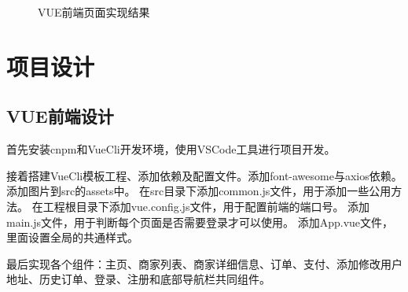 \begin{figure}[H]
{\begin{minipage}[t]{0.22\linewidth}
        \end{minipage}
    }
    \centering
    \caption{VUE前端页面实现结果}
\end{figure}

\section{项目设计}

\subsection{VUE前端设计}
首先安装cnpm和VueCli开发环境，使用VSCode工具进行项目开发。

接着搭建VueCli模板工程、添加依赖及配置文件。添加font-awesome与axios依赖。
添加图片到src的assets中。
在src目录下添加common.js文件，用于添加一些公用方法。
在工程根目录下添加vue.config.js文件，用于配置前端的端口号。
添加main.js文件，用于判断每个页面是否需要登录才可以使用。
添加App.vue文件，里面设置全局的共通样式。

最后实现各个组件：主页、商家列表、商家详细信息、订单、支付、添加修改用户地址、历史订单、登录、注册和底部导航栏共同组件。

